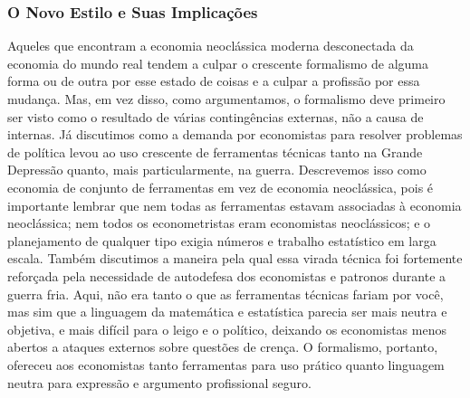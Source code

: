 \documentclass[12pt]{article}
\begin{document}
\subsubsection{\textbf{O Novo Estilo e Suas Implicações}}

Aqueles que encontram a economia neoclássica moderna desconectada da economia do mundo real tendem a culpar o crescente formalismo de alguma forma ou de outra por esse estado de coisas e a culpar a profissão por essa mudança. Mas, em vez disso, como argumentamos, o formalismo deve primeiro ser visto como o resultado de várias contingências externas, não a causa de internas. Já discutimos como a demanda por economistas para resolver problemas de política levou ao uso crescente de ferramentas técnicas tanto na Grande Depressão quanto, mais particularmente, na guerra. Descrevemos isso como economia de conjunto de ferramentas em vez de economia neoclássica, pois é importante lembrar que nem todas as ferramentas estavam associadas à economia neoclássica; nem todos os econometristas eram economistas neoclássicos; e o planejamento de qualquer tipo exigia números e trabalho estatístico em larga escala. Também discutimos a maneira pela qual essa virada técnica foi fortemente reforçada pela necessidade de autodefesa dos economistas e patronos durante a guerra fria. Aqui, não era tanto o que as ferramentas técnicas fariam por você, mas sim que a linguagem da matemática e estatística parecia ser mais neutra e objetiva, e mais difícil para o leigo e o político, deixando os economistas menos abertos a ataques externos sobre questões de crença. O formalismo, portanto, ofereceu aos economistas tanto ferramentas para uso prático quanto linguagem neutra para expressão e argumento profissional seguro.
\end{document}
